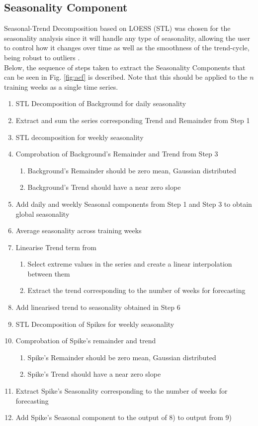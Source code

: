 \documentclass[conference, letterpaper]{IEEEtran}
\begin{document}
\subsection{Seasonality Component}
Seasonal-Trend Decomposition based on LOESS (STL) \cite{STL} was chosen for the seasonality analysis since it will handle any type of seasonality, allowing the user to control how it changes over time as well as the smoothness of the trend-cycle, being robust to outliers \cite{forecasting}.\\

Below, the sequence of steps taken to extract the Seasonality Components that can be seen in Fig. \ref{fig:acf} is described. 
Note that this should be applied to the $n$ training weeks as a single time series.
\begin{enumerate}
	\item STL Decomposition of Background for daily seasonality
	\item Extract and sum the series corresponding Trend and Remainder from Step 1
	\item STL decomposition for weekly seasonality
	\item Comprobation of Background's Remainder and Trend from Step 3
	\begin{enumerate}
		\item Background's Remainder should be zero mean, Gaussian distributed
		\item Background's Trend should have a near zero slope
	\end{enumerate}
	\item Add daily and weekly Seasonal components from Step 1 and Step 3 to obtain global seasonality
	\item Average seasonality across training weeks
	\item Linearise Trend term from
	\begin{enumerate}
		\item Select extreme values in the series and create a linear interpolation between them
		\item Extract the trend corresponding to the number of weeks for forecasting
	\end{enumerate}
	\item Add linearised trend to seasonality obtained in Step 6
	\item STL Decomposition of Spikes for weekly seasonality
	\item Comprobation of Spike's remainder and trend
	\begin{enumerate}
		\item Spike's Remainder should be zero mean, Gaussian distributed
		\item Spike's Trend should have a near zero slope
	\end{enumerate}
	\item Extract Spike's Seasonality corresponding to the number of weeks for forecasting
	\item Add Spike's Seasonal component to the output of 8) to output from 9)
\end{enumerate}
\end{document}
